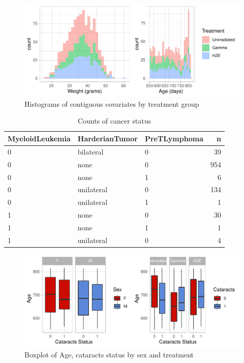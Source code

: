 \documentclass[12pt]{article}
\begin{document}
\begin{figure}[H]

{\centering \includegraphics{bookdown_report_files/figure-latex/eda-1} 

}

\caption{Histograms of contiguous covariates by treatment group}\label{fig:eda}
\end{figure}

\begin{table}[!h]
\centering
\begin{tabular}{lllr}
  \toprule
MyeloidLeukemia & HarderianTumor & PreTLymphoma & n \\ 
  \midrule
0 & bilateral & 0 &  39 \\ 
  0 & none & 0 & 954 \\ 
  0 & none & 1 &   6 \\ 
  0 & unilateral & 0 & 134 \\ 
  0 & unilateral & 1 &   1 \\ 
  1 & none & 0 &  30 \\ 
  1 & none & 1 &   1 \\ 
  1 & unilateral & 0 &   4 \\ 
   \bottomrule
\end{tabular}
\caption{Counts of cancer status} 
\end{table}

\begin{figure}[H]

{\centering \includegraphics{bookdown_report_files/figure-latex/scage-1} 

}

\caption{Boxplot of Age, cataracts status by sex and treatment}\label{fig:scage}
\end{figure}
\end{document}
